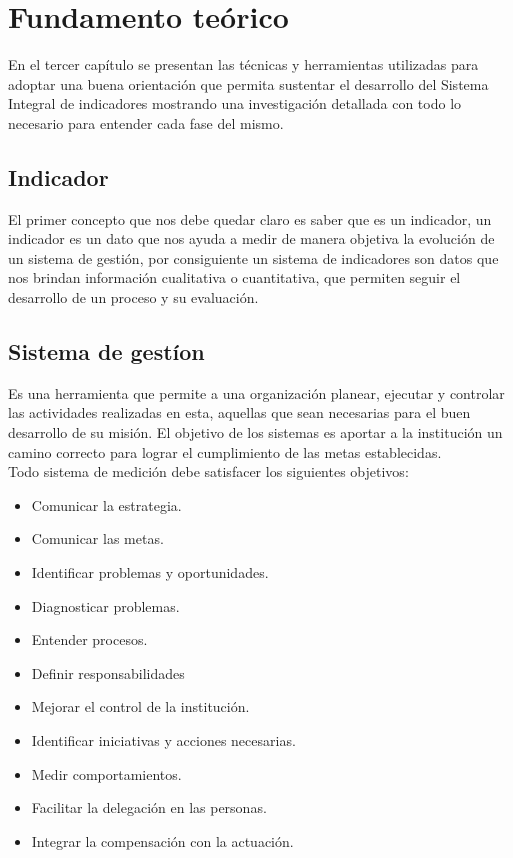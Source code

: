 \chapter{Fundamento te\'orico}

	En el tercer cap\'itulo se presentan las t\'ecnicas y herramientas utilizadas para adoptar una buena orientaci\'on que permita sustentar el desarrollo del Sistema Integral de indicadores mostrando una investigaci\'on detallada con todo lo necesario para entender cada fase del mismo.

	\section{Indicador}
		El primer concepto que nos debe quedar claro es saber que es un indicador, un indicador es un dato que nos ayuda a medir de manera objetiva la evoluci\'on de un sistema de gesti\'on, por consiguiente un sistema de indicadores son datos que nos brindan informaci\'on cualitativa o cuantitativa, que permiten seguir el desarrollo de un proceso y su evaluaci\'on.

	\section{Sistema de gest\'ion}
		Es una herramienta que permite a una organizaci\'on planear, ejecutar y controlar las actividades realizadas en esta, aquellas que sean necesarias para el buen desarrollo de su misi\'on. El objetivo de los sistemas es aportar a la instituci\'on  un camino correcto para lograr el cumplimiento de las metas establecidas. \\
	
	Todo sistema de medici\'on debe satisfacer los siguientes objetivos:

	\begin{itemize}
		\item Comunicar la estrategia.
		\item Comunicar las metas.
		\item Identificar problemas y oportunidades.
		\item Diagnosticar problemas.
		\item Entender procesos.
		\item Definir responsabilidades
		\item Mejorar el control de la instituci\'on.
		\item Identificar iniciativas y acciones necesarias.
		\item Medir comportamientos.
		\item Facilitar la delegaci\'on en las personas.
		\item Integrar la compensaci\'on con la actuaci\'on. 
	\end{itemize}


